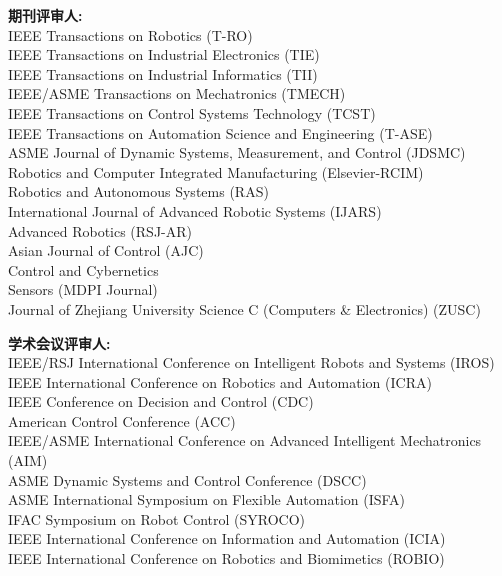 \documentclass[UTF8,nofonts]{res}
\begin{document}
\begin{resume}
    \textbf{期刊评审人:}\\
    IEEE Transactions on Robotics (T-RO)\\
    IEEE Transactions on Industrial Electronics (TIE)\\
    IEEE Transactions on Industrial Informatics (TII)\\
    IEEE/ASME Transactions on Mechatronics (TMECH)\\
    IEEE Transactions on Control Systems Technology (TCST)\\
    IEEE Transactions on Automation Science and Engineering (T-ASE)\\
    ASME Journal of Dynamic Systems, Measurement, and Control (JDSMC)\\
    Robotics and Computer Integrated Manufacturing (Elsevier-RCIM)\\
    Robotics and Autonomous Systems (RAS)\\
    International Journal of Advanced Robotic Systems (IJARS)\\
    Advanced Robotics (RSJ-AR)\\
    Asian Journal of Control (AJC)\\
    Control and Cybernetics\\
    Sensors (MDPI Journal)\\
    Journal of Zhejiang University Science C (Computers \& Electronics) (ZUSC)

    \textbf{学术会议评审人:}\\
    IEEE/RSJ International Conference on Intelligent Robots and Systems (IROS)\\
    IEEE International Conference on Robotics and Automation (ICRA)\\
    IEEE Conference on Decision and Control (CDC)\\
    American Control Conference (ACC)\\
    IEEE/ASME International Conference on Advanced Intelligent Mechatronics (AIM)\\
    ASME Dynamic Systems and Control Conference (DSCC)\\
    ASME International Symposium on Flexible Automation (ISFA)\\
    IFAC Symposium on Robot Control (SYROCO)\\
    IEEE International Conference on Information and Automation (ICIA)\\
    IEEE International Conference on Robotics and Biomimetics (ROBIO)


\end{resume}
\end{document}
